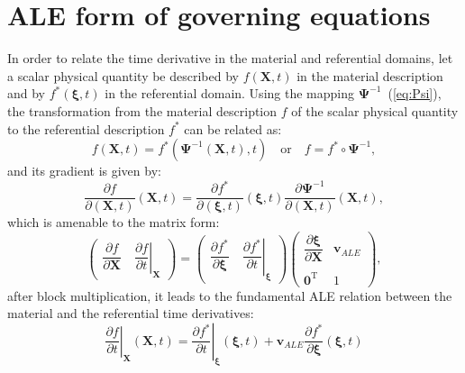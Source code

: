 \section{ALE form of governing equations}
In order to relate the time derivative in the material and referential domains, let a scalar physical quantity be described by $ f (\mathbf{X},t) $  in the material description and by $f^{*} (\boldsymbol{\xi}, t)$ in the referential domain. Using the mapping $\mathbf{\Psi}^{-1}$~(\ref{eq:Psi}), the transformation from 
the material  description $f$  of the scalar physical quantity to the referential description $f^{*}$ can be related as:
\begin{equation}
f(\mathbf{X},t) = f^{*}(\mathbf{\Psi}^{-1}(\mathbf{X},t), t) \quad \text{or}  \quad  f = f^* \circ \mathbf{\Psi}^{-1},
\end{equation}
and its gradient is given by: 
\begin{equation}
\dfrac{\partial f}{\partial (\mathbf{X},t) }(\mathbf{X},t) = \dfrac{\partial f^*}{\partial (\boldsymbol{\xi},t) }(\boldsymbol{\xi},t) \dfrac{\partial \mathbf{\Psi}^{-1}}{\partial (\mathbf{X},t) }(\mathbf{X},t),
\end{equation}
which is amenable to the matrix form: 
\begin{equation}
\begin{pmatrix} \dfrac{\partial f}{\partial \mathbf{X}}   \quad  \left.\dfrac{\partial f}{\partial t}\right|_{\mathbf{X}}\end{pmatrix}  = \begin{pmatrix} \dfrac{\partial f^*}{\partial \boldsymbol{\xi}}   \quad  \left.\dfrac{\partial f^*}{\partial t}\right|_{\boldsymbol{\xi}}\end{pmatrix} 
\begin{pmatrix}
\dfrac{\partial \boldsymbol{\xi}}{\partial \mathbf{X}}  & \mathbf{v}_{ALE}
\\
\\
\mathbf{0}^{\operatorname{T}} & {1}
\end{pmatrix}, 
\end{equation}
after block multiplication, it leads to the fundamental ALE relation between 
the material and the referential time derivatives:
\begin{equation}
\left.\dfrac{\partial f}{\partial t}\right|_{\mathbf{X}} (\mathbf{X},t) = \left.\dfrac{\partial f^*}{\partial t}\right|_{\boldsymbol{\xi}} (\boldsymbol{\xi},t) + \mathbf{v}_{ALE} \dfrac{\partial f^*}{\partial \boldsymbol{\xi}} (\boldsymbol{\xi},t)
\label{eq:time_deriv_transformation}
\end{equation}
